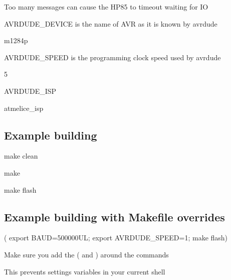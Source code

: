 \begin{DoxyItemize}
\begin{DoxyItemize}
\begin{DoxyItemize}
\begin{DoxyItemize}
\begin{DoxyItemize}
\item Too many messages can cause the H\+P85 to timeout waiting for IO
\end{DoxyItemize}
\end{DoxyItemize}
\end{DoxyItemize}
\item A\+V\+R\+D\+U\+D\+E\+\_\+\+D\+E\+V\+I\+CE is the name of A\+VR as it is known by avrdude
\begin{DoxyItemize}
\item m1284p
\end{DoxyItemize}
\item A\+V\+R\+D\+U\+D\+E\+\_\+\+S\+P\+E\+ED is the programming clock speed used by avrdude
\begin{DoxyItemize}
\item 5
\end{DoxyItemize}
\item A\+V\+R\+D\+U\+D\+E\+\_\+\+I\+SP
\begin{DoxyItemize}
\item atmelice\+\_\+isp
\end{DoxyItemize}
\end{DoxyItemize}
\end{DoxyItemize}

\subsection*{Example building}


\begin{DoxyItemize}
\item make clean
\item make
\item make flash
\end{DoxyItemize}

\subsection*{Example building with Makefile overrides}


\begin{DoxyItemize}
\item ( export B\+A\+UD=500000\+UL; export A\+V\+R\+D\+U\+D\+E\+\_\+\+S\+P\+E\+ED=1; make flash)
\begin{DoxyItemize}
\item Make sure you add the \textquotesingle{}(\textquotesingle{} and \textquotesingle{})\textquotesingle{} around the commands
\begin{DoxyItemize}
\item This prevents settings variables in your current shell
\end{DoxyItemize}
\end{DoxyItemize}
\end{DoxyItemize}





